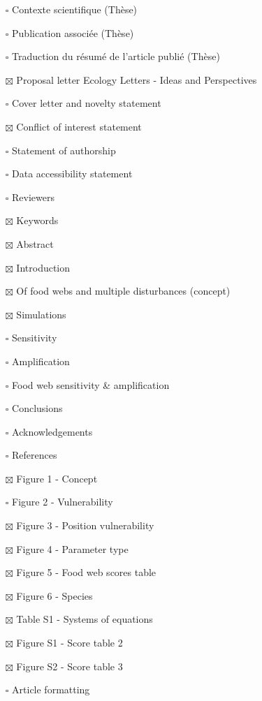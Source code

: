 \begin{itemize}
\tightlist
\item[$\square$]
  Contexte scientifique (Thèse)
\item[$\square$]
  Publication associée (Thèse)
\item[$\square$]
  Traduction du résumé de l'article publié (Thèse)
\item[$\boxtimes$]
  Proposal letter Ecology Letters - Ideas and Perspectives
\item[$\square$]
  Cover letter and novelty statement
\item[$\boxtimes$]
  Conflict of interest statement
\item[$\square$]
  Statement of authorship
\item[$\square$]
  Data accessibility statement
\item[$\square$]
  Reviewers
\item[$\boxtimes$]
  Keywords
\item[$\boxtimes$]
  Abstract
\item[$\boxtimes$]
  Introduction
\item[$\boxtimes$]
  Of food webs and multiple disturbances (concept)
\item[$\boxtimes$]
  Simulations
\item[$\square$]
  Sensitivity
\item[$\square$]
  Amplification
\item[$\square$]
  Food web sensitivity \& amplification
\item[$\square$]
  Conclusions
\item[$\square$]
  Acknowledgements
\item[$\square$]
  References
\item[$\boxtimes$]
  Figure 1 - Concept
\item[$\square$]
  Figure 2 - Vulnerability
\item[$\boxtimes$]
  Figure 3 - Position vulnerability
\item[$\boxtimes$]
  Figure 4 - Parameter type
\item[$\boxtimes$]
  Figure 5 - Food web scores table
\item[$\boxtimes$]
  Figure 6 - Species
\item[$\boxtimes$]
  Table S1 - Systems of equations
\item[$\boxtimes$]
  Figure S1 - Score table 2
\item[$\boxtimes$]
  Figure S2 - Score table 3
\item[$\square$]
  Article formatting
\end{itemize}

